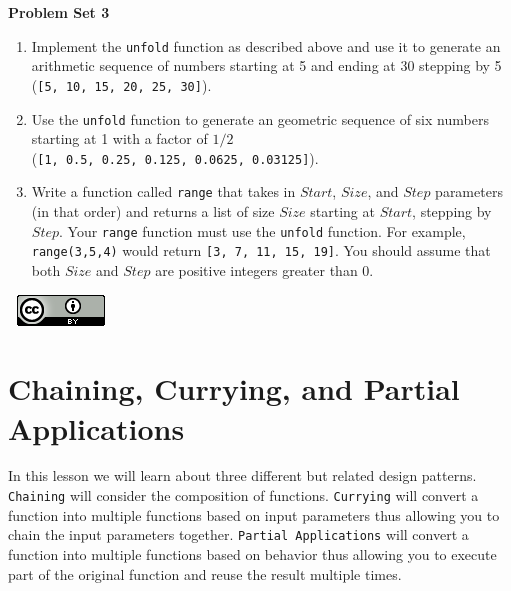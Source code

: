 \documentclass[
]{book}
\providecommand{\tightlist}{%
  \setlength{\itemsep}{0pt}\setlength{\parskip}{0pt}}
\begin{document}
\begin{problembox}

\textbf{Problem Set 3}

\begin{enumerate}
\def\labelenumi{\arabic{enumi}.}
\tightlist
\item
  Implement the \texttt{unfold} function as described above and use it to generate an arithmetic sequence of numbers starting at 5 and ending at 30 stepping by 5 (\texttt{{[}5,\ 10,\ 15,\ 20,\ 25,\ 30{]}}).
\item
  Use the \texttt{unfold} function to generate an geometric sequence of six numbers starting at 1 with a factor of \(1/2\) (\texttt{{[}1,\ 0.5,\ 0.25,\ 0.125,\ 0.0625,\ 0.03125{]}}).
\item
  Write a function called \texttt{range} that takes in \(Start\), \(Size\), and \(Step\) parameters (in that order) and returns a list of size \(Size\) starting at \(Start\), stepping by \(Step\). Your \texttt{range} function must use the \texttt{unfold} function. For example, \texttt{range(3,5,4)} would return \texttt{{[}3,\ 7,\ 11,\ 15,\ 19{]}}. You should assume that both \(Size\) and \(Step\) are positive integers greater than 0.
\end{enumerate}

\end{problembox}

\(\nonumber\)
\(\nonumber\)
\href{http://creativecommons.org/licenses/by/4.0/}{\includegraphics{images/cc-88x31.png}}

\hypertarget{chaining-currying-and-partial-applications}{%
\chapter{Chaining, Currying, and Partial Applications}\label{chaining-currying-and-partial-applications}}

In this lesson we will learn about three different but related design patterns. \texttt{Chaining} will consider the composition of functions. \texttt{Currying} will convert a function into multiple functions based on input parameters thus allowing you to chain the input parameters together. \texttt{Partial\ Applications} will convert a function into multiple functions based on behavior thus allowing you to execute part of the original function and reuse the result multiple times.
\end{document}

